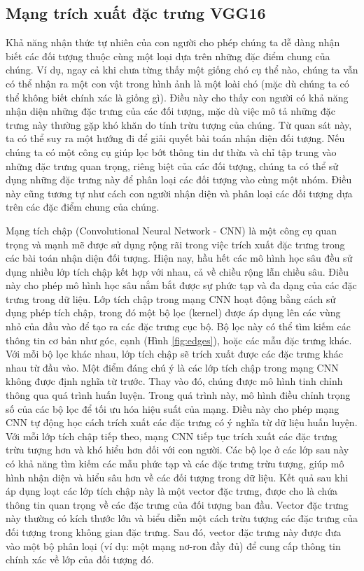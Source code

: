 \documentclass[a4paper]{article}
\begin{document}
\subsection{\textbf{Mạng trích xuất đặc trưng VGG16}}

Khả năng nhận thức tự nhiên của con người cho phép chúng ta dễ dàng nhận biết các đối tượng thuộc cùng một loại dựa trên những đặc điểm chung của chúng. Ví dụ, ngay cả khi chưa từng thấy một giống chó cụ thể nào, chúng ta vẫn có thể nhận ra một con vật trong hình ảnh là một loài chó (mặc dù chúng ta có thể không biết chính xác là giống gì). Điều này cho thấy con người có khả năng nhận diện những đặc trưng của các đối tượng, mặc dù việc mô tả những đặc trưng này thường gặp khó khăn do tính trừu tượng của chúng. Từ quan sát này, ta có thể suy ra một hướng đi để giải quyết bài toán nhận diện đối tượng. Nếu chúng ta có một công cụ giúp lọc bớt thông tin dư thừa và chỉ tập trung vào những đặc trưng quan trọng, riêng biệt của các đối tượng, chúng ta có thể sử dụng những đặc trưng này để phân loại các đối tượng vào cùng một nhóm. Điều này cũng tương tự như cách con người nhận diện và phân loại các đối tượng dựa trên các đặc điểm chung của chúng.

Mạng tích chập (Convolutional Neural Network - CNN) là một công cụ quan trọng và mạnh mẽ được sử dụng rộng rãi trong việc trích xuất đặc trưng trong các bài toán nhận diện đối tượng. Hiện nay, hầu hết các mô hình học sâu đều sử dụng nhiều lớp tích chập kết hợp với nhau, cả về chiều rộng lẫn chiều sâu. Điều này cho phép mô hình học sâu nắm bắt được sự phức tạp và đa dạng của các đặc trưng trong dữ liệu. Lớp tích chập trong mạng CNN hoạt động bằng cách sử dụng phép tích chập, trong đó một bộ lọc (kernel) được áp dụng lên các vùng nhỏ của đầu vào để tạo ra các đặc trưng cục bộ. Bộ lọc này có thể tìm kiếm các thông tin cơ bản như góc, cạnh (Hình \ref{fig:edges}), hoặc các mẫu đặc trưng khác. Với mỗi bộ lọc khác nhau, lớp tích chập sẽ trích xuất được các đặc trưng khác nhau từ đầu vào. Một điểm đáng chú ý là các lớp tích chập trong mạng CNN không được định nghĩa từ trước. Thay vào đó, chúng được mô hình tinh chỉnh thông qua quá trình huấn luyện. Trong quá trình này, mô hình điều chỉnh trọng số của các bộ lọc để tối ưu hóa hiệu suất của mạng. Điều này cho phép mạng CNN tự động học cách trích xuất các đặc trưng có ý nghĩa từ dữ liệu huấn luyện. Với mỗi lớp tích chập tiếp theo, mạng CNN tiếp tục trích xuất các đặc trưng trừu tượng hơn và khó hiểu hơn đối với con người. Các bộ lọc ở các lớp sau này có khả năng tìm kiếm các mẫu phức tạp và các đặc trưng trừu tượng, giúp mô hình nhận diện và hiểu sâu hơn về các đối tượng trong dữ liệu. Kết quả sau khi áp dụng loạt các lớp tích chập này là một vector đặc trưng, được cho là chứa thông tin quan trọng về các đặc trưng của đối tượng ban đầu. Vector đặc trưng này thường có kích thước lớn và biểu diễn một cách trừu tượng các đặc trưng của đối tượng trong không gian đặc trưng. Sau đó, vector đặc trưng này được đưa vào một bộ phân loại (ví dụ: một mạng nơ-ron đầy đủ) để cung cấp thông tin chính xác về lớp của đối tượng đó.
\end{document}
